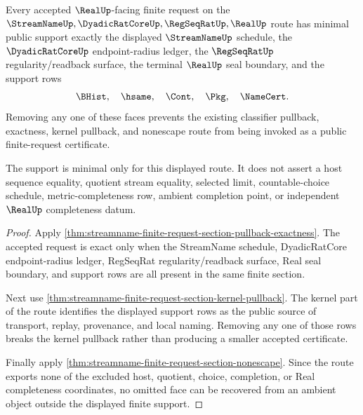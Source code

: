\begin{theorem}
\label{thm:streamname-finite-request-terminal-support-minimality}
Every accepted $\RealUp$-facing finite request on the
$\StreamNameUp,\DyadicRatCoreUp,\RegSeqRatUp,\RealUp$ route has minimal public
support exactly the displayed $\StreamNameUp$ schedule, the
$\DyadicRatCoreUp$ endpoint-radius ledger, the $\RegSeqRatUp$
regularity/readback surface, the terminal $\RealUp$ seal boundary, and the
support rows
$$
\BHist,\quad \hsame,\quad \Cont,\quad \Pkg,\quad \NameCert.
$$
Removing any one of these faces prevents the existing classifier pullback,
exactness, kernel pullback, and nonescape route from being invoked as a public
finite-request certificate.

The support is minimal only for this displayed route. It does not assert a
host sequence equality, quotient stream equality, selected limit,
countable-choice schedule, metric-completeness row, ambient completion point,
or independent $\RealUp$ completeness datum.
\end{theorem}
\begin{proof}
Apply
\autoref{thm:streamname-finite-request-section-pullback-exactness}. The
accepted request is exact only when the StreamName schedule, DyadicRatCore
endpoint-radius ledger, RegSeqRat regularity/readback surface, Real seal
boundary, and support rows are all present in the same finite section.

Next use
\autoref{thm:streamname-finite-request-section-kernel-pullback}. The kernel
part of the route identifies the displayed support rows as the public source
of transport, replay, provenance, and local naming. Removing any one of those
rows breaks the kernel pullback rather than producing a smaller accepted
certificate.

Finally apply
\autoref{thm:streamname-finite-request-section-nonescape}. Since the route
exports none of the excluded host, quotient, choice, completion, or Real
completeness coordinates, no omitted face can be recovered from an ambient
object outside the displayed finite support.
\end{proof}
